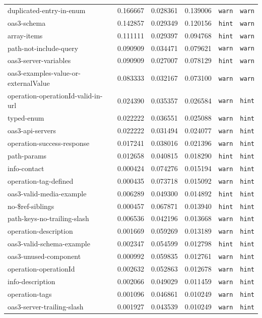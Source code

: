{\begin{longtable}{lrrrrr}
  duplicated-entry-in-enum & 0.166667 &  0.028361 & 0.139006 & \texttt{warn} &  \texttt{warn} \\ 
  oas3-schema &  0.142857 &  0.029349 & 0.120156 & \texttt{hint} &  \texttt{warn} \\ 
  array-items &  0.111111 &  0.029397 & 0.094768 & \texttt{hint} &  \texttt{warn} \\ 
  path-not-include-query & 0.090909 &  0.034471 & 0.079621 & \texttt{warn} &  \texttt{warn} \\ 
  oas3-server-variables &  0.090909 &  0.027007 & 0.078129 & \texttt{hint} &  \texttt{warn} \\ 
  oas3-examples-value-or-externalValue & 0.083333 &  0.032167 & 0.073100 & \texttt{warn} &  \texttt{warn} \\ \hline
  operation-operationId-valid-in-url & 0.024390 &  0.035357 & 0.026584 & \texttt{warn} &  \texttt{hint} \\ 
  typed-enum & 0.022222 &  0.036551 & 0.025088 & \texttt{warn} &  \texttt{hint} \\ 
  oas3-api-servers & 0.022222 &  0.031494 & 0.024077 & \texttt{warn} &  \texttt{hint} \\ 
  operation-success-response & 0.017241 &  0.038016 & 0.021396 & \texttt{warn} &  \texttt{hint} \\ 
  path-params &  0.012658 &  0.040815 & 0.018290 & \texttt{hint} &  \texttt{hint} \\ 
  info-contact & 0.000424 &  0.074276 & 0.015194 & \texttt{warn} &  \texttt{hint} \\ 
  operation-tag-defined &  0.000435 &  0.073718 & 0.015092 & \texttt{warn} &  \texttt{hint} \\ 
  oas3-valid-media-example & 0.006289 &  0.049300 & 0.014892 & \texttt{hint} &  \texttt{hint} \\ 
  no-\$ref-siblings & 0.000457 &  0.067871 & 0.013940 & \texttt{hint} &  \texttt{hint} \\ 
  path-keys-no-trailing-slash &  0.006536 &  0.042196 & 0.013668 & \texttt{warn} &  \texttt{hint} \\ 
  operation-description &  0.001669 &  0.059269 & 0.013189 & \texttt{warn} &  \texttt{hint} \\ 
  oas3-valid-schema-example &  0.002347 &  0.054599 & 0.012798 & \texttt{hint} &  \texttt{hint} \\ 
  oas3-unused-component &  0.000992 &  0.059835 & 0.012761 & \texttt{warn} &  \texttt{hint} \\ 
  operation-operationId &  0.002632 &  0.052863 & 0.012678 & \texttt{warn} &  \texttt{hint} \\ 
  info-description & 0.002066 &  0.049029 & 0.011459 & \texttt{warn} &  \texttt{hint} \\ 
  operation-tags & 0.001096 &  0.046861 & 0.010249 & \texttt{warn} &  \texttt{hint} \\ 
  oas3-server-trailing-slash & 0.001927 &  0.043539 & 0.010249 & \texttt{warn} &  \texttt{hint} \\ \hline\hline
\end{longtable}
}


